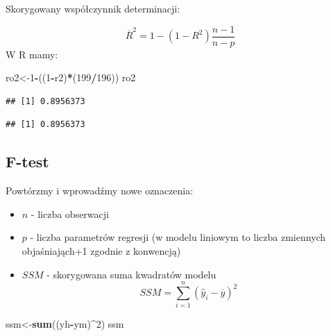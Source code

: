\documentclass[]{article}
\newenvironment{Shaded}{\begin{snugshade}}{\end{snugshade}}
\newcommand{\KeywordTok}[1]{\textcolor[rgb]{0.13,0.29,0.53}{\textbf{#1}}}
\newcommand{\DecValTok}[1]{\textcolor[rgb]{0.00,0.00,0.81}{#1}}
\newcommand{\OperatorTok}[1]{\textcolor[rgb]{0.81,0.36,0.00}{\textbf{#1}}}
\newcommand{\NormalTok}[1]{#1}
\providecommand{\tightlist}{%
  \setlength{\itemsep}{0pt}\setlength{\parskip}{0pt}}
\begin{document}
Skorygowany współczynnik determinacji:

\[\overline{R}^2=1 - (1 - R^2) \frac{n - 1}{n - p}\] W R mamy:

\begin{Shaded}
\begin{Highlighting}[]
\NormalTok{ro2<-}\DecValTok{1}\OperatorTok{-}\NormalTok{((}\DecValTok{1}\OperatorTok{-}\NormalTok{r2)}\OperatorTok{*}\NormalTok{(}\DecValTok{199}\OperatorTok{/}\DecValTok{196}\NormalTok{))}
\NormalTok{ro2}
\end{Highlighting}
\end{Shaded}

\begin{verbatim}
## [1] 0.8956373
\end{verbatim}

\begin{Shaded}
\end{Shaded}

\begin{verbatim}
## [1] 0.8956373
\end{verbatim}

\subsection{F-test}\label{f-test}

Powtórzmy i wprowadźmy nowe oznaczenia:

\begin{itemize}
\tightlist
\item
  \(n\) - liczba obserwacji
\item
  \(p\) - liczba parametrów regresji (w modelu liniowym to liczba
  zmiennych objaśniająch+1 zgodnie z konwencją)
\item
  \(SSM\) - skorygowana suma kwadratów modelu
  \[SSM=\sum_{i=1}^n ( \hat{y}_i-\overline{y} )^2\]
\end{itemize}

\begin{Shaded}
\begin{Highlighting}[]
\NormalTok{ssm<-}\KeywordTok{sum}\NormalTok{((yh}\OperatorTok{-}\NormalTok{ym)}\OperatorTok{^}\DecValTok{2}\NormalTok{)}
\NormalTok{ssm}
\end{Highlighting}
\end{Shaded}
\end{document}
